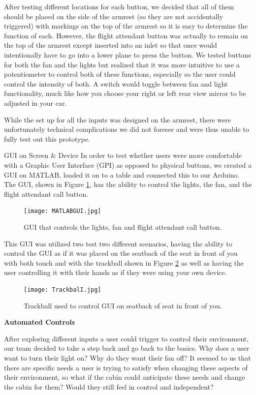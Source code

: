 After testing different locations for each button, we decided that all of them should be placed on the side of the armrest (so they are not accidentally triggered) with markings on the top of the armrest so it is easy to determine the function of each. However, the flight attendant button was actually to remain on the top of the armrest except inserted into an inlet so that once would intentionally have to go into a lower plane to press the button. We tested buttons for both the fan and the lights but realized that it was more intuitive to use a potentiometer to control both of these functions, especially so the user could control the intensity of both. A switch would toggle between fan and light functionality, much like how you choose your right or left rear view mirror to be adjusted in your car.  

While the set up for all the inputs was designed on the armrest, there were unfortunately technical complications we did not foresee and were thus unable to fully test out this prototype. 

GUI on Screen & Device
In order to test whether users were more comfortable with a Graphic User Interface (GPI) as opposed to physical buttons, we created a GUI on MATLAB, loaded it on to a table and connected this to our Arduino. The GUI, shown in Figure \ref{fig:MATLABGUI.jpg}, has the ability to control the lights, the fan, and the flight attendant call button.

\begin{figure}[h]
  \centering
     \texttt{[image: MATLABGUI.jpg]}
   \caption{ GUI that controls the lights, fan and flight attendant call button. }
  \label{fig:MATLABGUI.jpg}
\end{figure}

This GUI was utilized two test two different scenarios, having the ability to control the GUI as if it was placed on the seatback of the seat in front of you with both touch and with the trackball shown in Figure \ref{fig:Trackball.jpg} as well as having the user controlling it with their hands as if they were using your own device. 

\begin{figure}[h]
  \centering
     \texttt{[image: TrackbalI.jpg]}
   \caption{ Trackball used to control GUI on seatback of seat in front of you. }
  \label{fig:Trackball.jpg}
\end{figure}


\textbf{Automated Controls}

After exploring different inputs a user could trigger to control their environment, our team decided to take a step back and go back to the basics. Why does a user want to turn their light on? Why do they want their fan off? It seemed to us that there are specific needs a user is trying to satisfy when changing these aspects of their environment, so what if the cabin could anticipate these needs and change the cabin for them? Would they still feel in control and independent? 

